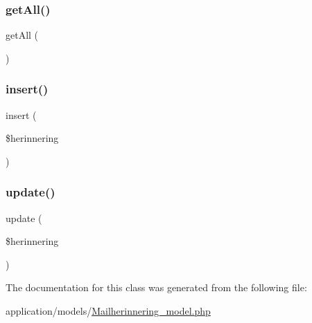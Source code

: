 \subsubsection{\texorpdfstring{get\+All()}{getAll()}}
{\footnotesize\ttfamily get\+All (\begin{DoxyParamCaption}{ }\end{DoxyParamCaption})}

\mbox{\label{class_mailherinnering__model_a1ffebfb064147228f479c1d0b83ac50d}} 
\subsubsection{\texorpdfstring{insert()}{insert()}}
{\footnotesize\ttfamily insert (\begin{DoxyParamCaption}\item[{}]{\$herinnering }\end{DoxyParamCaption})}

\mbox{\label{class_mailherinnering__model_a33e5747900292af47d92a2fd6ba4d484}} 
\subsubsection{\texorpdfstring{update()}{update()}}
{\footnotesize\ttfamily update (\begin{DoxyParamCaption}\item[{}]{\$herinnering }\end{DoxyParamCaption})}



The documentation for this class was generated from the following file\+:\begin{DoxyCompactItemize}
\item 
application/models/\mbox{\hyperlink{_mailherinnering__model_8php}{Mailherinnering\+\_\+model.\+php}}\end{DoxyCompactItemize}
